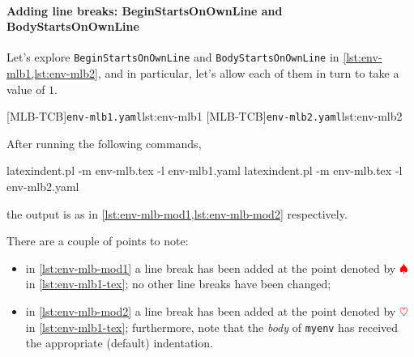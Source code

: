  \paragraph{Adding line breaks: BeginStartsOnOwnLine and BodyStartsOnOwnLine}
  \begin{example}
  Let's explore \texttt{BeginStartsOnOwnLine} and \texttt{BodyStartsOnOwnLine} in
  \cref{lst:env-mlb1,lst:env-mlb2}, and in particular, let's allow each of them in turn to
  take a value of $1$.  

  \begin{cmhtcbraster}
   [MLB-TCB]{\texttt{env-mlb1.yaml}}{lst:env-mlb1}
   [MLB-TCB]{\texttt{env-mlb2.yaml}}{lst:env-mlb2}
  \end{cmhtcbraster}

  After running the following commands, 

  \begin{commandshell}
latexindent.pl -m env-mlb.tex -l env-mlb1.yaml
latexindent.pl -m env-mlb.tex -l env-mlb2.yaml
\end{commandshell}

  the output is as in \cref{lst:env-mlb-mod1,lst:env-mlb-mod2} respectively.

  \begin{widepage}
   \begin{minipage}{.56\linewidth}
   \end{minipage}
   \hfill
   \begin{minipage}{.43\linewidth}
   \end{minipage}
  \end{widepage}

  There are a couple of points to note:
  \begin{itemize}
   \item in \cref{lst:env-mlb-mod1} a line break has been added at the point denoted by
         $\color{red}\spadesuit$ in \cref{lst:env-mlb1-tex}; no other line breaks have been
         changed;
   \item in \cref{lst:env-mlb-mod2} a line break has been added at the point denoted by
         $\color{red}\heartsuit$ in \cref{lst:env-mlb1-tex}; furthermore, note that the \emph{body}
         of \texttt{myenv} has received the appropriate (default) indentation.
  \end{itemize}
  \end{example}

